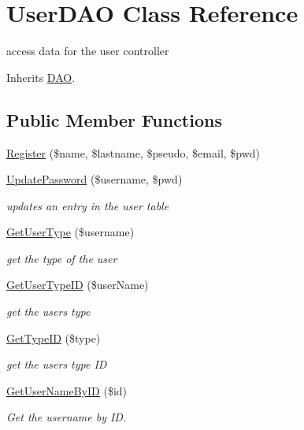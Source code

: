 \hypertarget{class_user_d_a_o}{}\section{User\+D\+AO Class Reference}
\label{class_user_d_a_o}


access data for the user controller  




Inherits \hyperlink{class_d_a_o}{D\+AO}.

\subsection*{Public Member Functions}
\begin{DoxyCompactItemize}
\item 
\hyperlink{class_user_d_a_o_ac3b69a336d57533a747597e093580d66}{Register} (\$name, \$lastname, \$pseudo, \$email, \$pwd)
\item 
\hyperlink{class_user_d_a_o_a140f38e8cbdf6aeb93146174a3a4f978}{Update\+Password} (\$username, \$pwd)
\begin{DoxyCompactList}\small\item\em updates an entry in the user table \end{DoxyCompactList}\item 
\hyperlink{class_user_d_a_o_ad14a0bb9938aa18999d1e9b655bb28b1}{Get\+User\+Type} (\$username)
\begin{DoxyCompactList}\small\item\em get the type of the user \end{DoxyCompactList}\item 
\hyperlink{class_user_d_a_o_a5c049c930f6e2a9933d752976bb721dc}{Get\+User\+Type\+ID} (\$user\+Name)
\begin{DoxyCompactList}\small\item\em get the user\textquotesingle{}s type \end{DoxyCompactList}\item 
\hyperlink{class_user_d_a_o_aca319b6c2beca52c72fd309d12adc9b4}{Get\+Type\+ID} (\$type)
\begin{DoxyCompactList}\small\item\em get the user\textquotesingle{}s type ID \end{DoxyCompactList}\item 
\hyperlink{class_user_d_a_o_a5f2cf101cdf7bb9e47c12733ca95ae72}{Get\+User\+Name\+By\+ID} (\$id)
\begin{DoxyCompactList}\small\item\em Get the username by ID. \end{DoxyCompactList}\item 

\end{DoxyCompactItemize}
